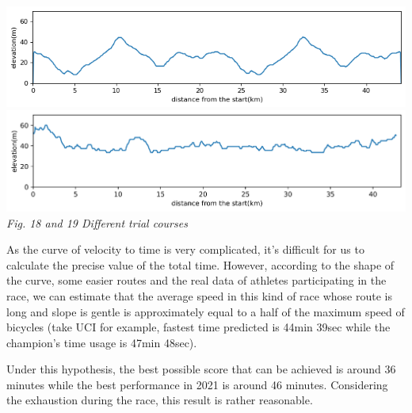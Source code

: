 \documentclass{article}
\begin{document}
		\begin{center}
			\includegraphics[width=15cm]{new18.png}\\
			\includegraphics[width=15cm]{7.png}\\
			\small \textit{Fig. 18 and 19  Different trial courses}
		\end{center}

		As the curve of velocity to time is very complicated, it's difficult for us to calculate the precise value of the total time. However, according to the shape of the curve, some easier routes and the real data of athletes participating in the race, we can estimate that the average speed in this kind of race whose route is long and slope is gentle is approximately equal to a half of the maximum speed of bicycles (take UCI for example, fastest time predicted is 44min 39sec while the champion's time usage is 47min 48sec).

		Under this hypothesis, the best possible score that can be achieved is around 36 minutes while the best performance in 2021 is around 46 minutes. Considering the exhaustion during the race, this result is rather reasonable.
\end{document}
